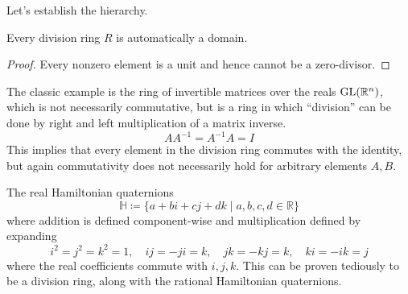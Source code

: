   Let's establish the hierarchy. 

  \begin{lemma}
    Every division ring $R$ is automatically a domain. 
  \end{lemma}
  \begin{proof}
    Every nonzero element is a unit and hence cannot be a zero-divisor. 
  \end{proof}

  \begin{example}
    The classic example is the ring of invertible matrices over the reals $\GL(\mathbb{R}^n)$, which is not necessarily commutative, but is a ring in which ``division'' can be done by right and left multiplication of a matrix inverse. 
    \begin{equation}
      A A^{-1} = A^{-1} A = I
    \end{equation}
    This implies that every element in the division ring commutes with the identity, but again commutativity does not necessarily hold for arbitrary elements $A, B$. 
  \end{example} 

  \begin{example}
    The real Hamiltonian quaternions 
    \begin{equation}
      \mathbb{H} \coloneqq \{a + bi + cj + dk \mid a, b, c, d \in \mathbb{R} \} 
    \end{equation}
    where addition is defined component-wise and multiplication defined by expanding 
    \begin{equation}
      i^2 = j^2 = k^2 = 1, \quad ij = -ji = k, \quad jk = -kj = k, \quad ki = -ik = j 
    \end{equation}
    where the real coefficients commute with $i, j, k$. This can be proven tediously to be a division ring, along with the rational Hamiltonian quaternions. 
  \end{example}

